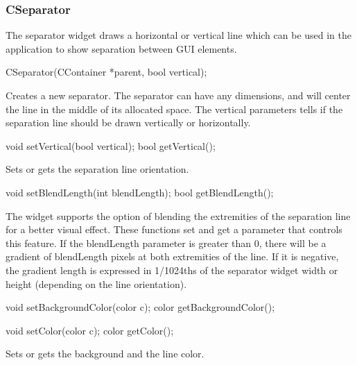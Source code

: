 \documentclass[a4paper,11pt]{journal}
\begin{document}
\subsubsection{CSeparator}
The separator widget draws a horizontal or vertical line which can be used in the application to show separation between GUI elements.\\
\begin{verbatimtab}CSeparator(CContainer *parent, bool vertical);\end{verbatimtab}
Creates a new separator. The separator can have any dimensions, and will center the line in the middle of its allocated space. The vertical parameters tells if the separation line should be drawn vertically or horizontally.\\
\begin{verbatimtab}
void setVertical(bool vertical);
bool getVertical();
\end{verbatimtab}
Sets or gets the separation line orientation.\\
\begin{verbatimtab}
void setBlendLength(int blendLength);
bool getBlendLength();
\end{verbatimtab}
The widget supports the option of blending the extremities of the separation line for a better visual effect. These functions set and get a parameter that controls this feature. If the blendLength parameter is greater than 0, there will be a gradient of blendLength pixels at both extremities of the line. If it is negative, the gradient length is expressed in 1/1024ths of the separator widget width or height (depending on the line orientation).\\
\begin{verbatimtab}
void setBackgroundColor(color c);
color getBackgroundColor();

void setColor(color c);
color getColor();
\end{verbatimtab}
Sets or gets the background and the line color.\\
\end{document}
